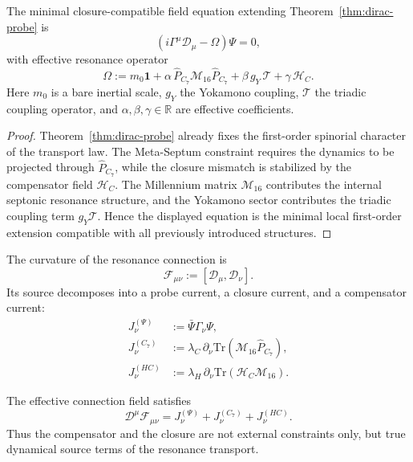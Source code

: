 \begin{theorem}
\label{thm:master-field-equation}
The minimal closure-compatible field equation extending
Theorem~\ref{thm:dirac-probe} is
\[
  \left(
    i\Gamma^\mu\mathcal D_\mu
    - \Omega
  \right)\Psi = 0,
\]
with effective resonance operator
\[
  \Omega
  :=
  m_0\mathbf 1
  + \alpha\,\hat P_{C_7}\mathcal M_{16}\hat P_{C_7}
  + \beta\,g_Y\,\mathcal T
  + \gamma\,\mathcal H_C.
\]
Here $m_0$ is a bare inertial scale, $g_Y$ the Yokamono coupling,
$\mathcal T$ the triadic coupling operator, and
$\alpha,\beta,\gamma\in\mathbb R$ are effective coefficients.
\end{theorem}

\begin{proof}
Theorem~\ref{thm:dirac-probe} already fixes the first-order spinorial
character of the transport law.
The Meta-Septum constraint requires the dynamics to be projected through
$\hat P_{C_7}$, while the closure mismatch is stabilized by the
compensator field $\mathcal H_C$.
The Millennium matrix $\mathcal M_{16}$ contributes the internal
septonic resonance structure, and the Yokamono sector contributes the
triadic coupling term $g_Y\mathcal T$.
Hence the displayed equation is the minimal local first-order extension
compatible with all previously introduced structures.
\end{proof}

\begin{definition}
The curvature of the resonance connection is
\[
  \mathcal F_{\mu\nu} := [\mathcal D_\mu,\mathcal D_\nu].
\]
Its source decomposes into a probe current, a closure current, and a
compensator current:
\begin{align*}
  J^{(\Psi)}_\nu &:= \bar\Psi\Gamma_\nu\Psi,\\
  J^{(C_7)}_\nu &:= \lambda_C\,\partial_\nu
    \mathrm{Tr}(\mathcal M_{16}\hat P_{C_7}),\\
  J^{(HC)}_\nu &:= \lambda_H\,\partial_\nu
    \mathrm{Tr}(\mathcal H_C\mathcal M_{16}).
\end{align*}
\end{definition}

\begin{theorem}
\label{thm:resonance-field-eq}
The effective connection field satisfies
\[
  \mathcal D^\mu\mathcal F_{\mu\nu}
  =
  J^{(\Psi)}_\nu + J^{(C_7)}_\nu + J^{(HC)}_\nu.
\]
Thus the compensator and the closure are not external constraints only,
but true dynamical source terms of the resonance transport.
\end{theorem}

